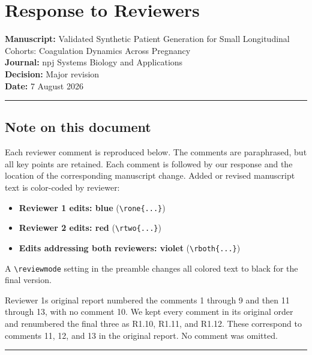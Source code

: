 \documentclass[
  11pt,
  letterpaper,
]{article}
\author{}
\date{}
\providecommand{\tightlist}{%
  \setlength{\itemsep}{0pt}\setlength{\parskip}{0pt}}
\begin{document}
\section{Response to Reviewers}\label{response-to-reviewers}

\textbf{Manuscript:} Validated Synthetic Patient Generation for Small Longitudinal Cohorts: Coagulation Dynamics Across Pregnancy\\
\textbf{Journal:} npj Systems Biology and Applications\\
\textbf{Decision:} Major revision\\
\textbf{Date:} 7 August 2026

\begin{center}\rule{0.5\linewidth}{0.5pt}\end{center}

\subsection{Note on this document}\label{note-on-this-document}

Each reviewer comment is reproduced below. The comments are paraphrased, but all key points are retained. Each comment is followed by our response and the location of the corresponding manuscript change. Added or revised manuscript text is color-coded by reviewer:

\begin{itemize}
\tightlist
\item
  \textbf{Reviewer 1 edits: blue} (\texttt{\textbackslash{}rone\{...\}})
\item
  \textbf{Reviewer 2 edits: red} (\texttt{\textbackslash{}rtwo\{...\}})
\item
  \textbf{Edits addressing both reviewers: violet} (\texttt{\textbackslash{}rboth\{...\}})
\end{itemize}

A \texttt{\textbackslash{}reviewmode} setting in the preamble changes all colored text to black for the final version.

Reviewer 1\textquotesingle s original report numbered the comments 1 through 9 and then 11 through 13, with no comment 10. We kept every comment in its original order and renumbered the final three as R1.10, R1.11, and R1.12. These correspond to comments 11, 12, and 13 in the original report. No comment was omitted.

\begin{center}\rule{0.5\linewidth}{0.5pt}\end{center}
\end{document}
